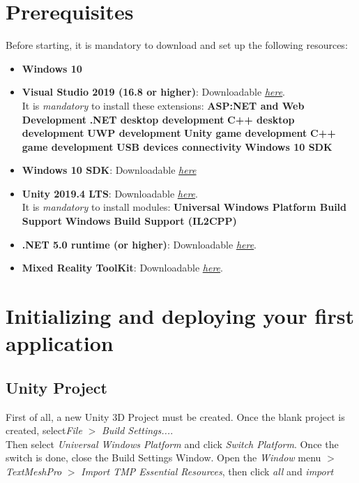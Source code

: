 \documentclass[12pt]{article}
\begin{document}
\section{Prerequisites}
Before starting, it is mandatory to download and set up the following resources:
\begin{itemize}
  \item \textbf{Windows 10}
  \item \textbf{Visual Studio 2019 (16.8 or higher)}: Downloadable \href{https://visualstudio.microsoft.com/downloads/}{\underline{\emph{here}}}.
  \\
  It is \emph{mandatory} to install these extensions:
  \subitem \textbf{ASP:NET and Web Development}
  \subitem \textbf{.NET desktop development}
  \subitem \textbf{C++ desktop development}
  \subitem \textbf{UWP development}
  \subitem \textbf{Unity game development}
  \subitem \textbf{C++ game development}
  \subitem \textbf{USB devices connectivity}
  \subitem \textbf{Windows 10 SDK}
  
  \item \textbf{Windows 10 SDK}: Downloadable \href{https://developer.microsoft.com//windows/downloads/windows-10-sdk}{\underline{\emph{here}}} 
  \item \textbf{Unity 2019.4 LTS}: Downloadable \href{https://unity3d.com/get-unity/download}{\underline{\emph{here}}}.
  \\
  It is \emph{mandatory} to install modules:
  \subitem \textbf{Universal Windows Platform Build Support}
  \subitem \textbf{Windows Build Support (IL2CPP)}
  
  \item \textbf{.NET 5.0 runtime (or higher)}: Downloadable \href{https://dotnet.microsoft.com/download/dotnet/5.0}{\underline{\emph{here}}}.
  
  \item \textbf{Mixed Reality ToolKit}: Downloadable \href{https://aka.ms/MRFeatureTool}{\underline{\emph{here}}}.
\end{itemize}

\section{Initializing and deploying your first application}
\subsection{Unity Project}
First of all, a new Unity 3D Project must be created.
Once the blank project is created, select\emph{File} $>$ \emph{Build Settings...}. \\
Then select \emph{Universal Windows Platform} and click \emph{Switch Platform}.
Once the switch is done, close the Build Settings Window. Open the \emph{Window} menu $>$ \emph{TextMeshPro} $>$ \emph{Import TMP Essential Resources}, then click \emph{all} and \emph{import}
\end{document}
